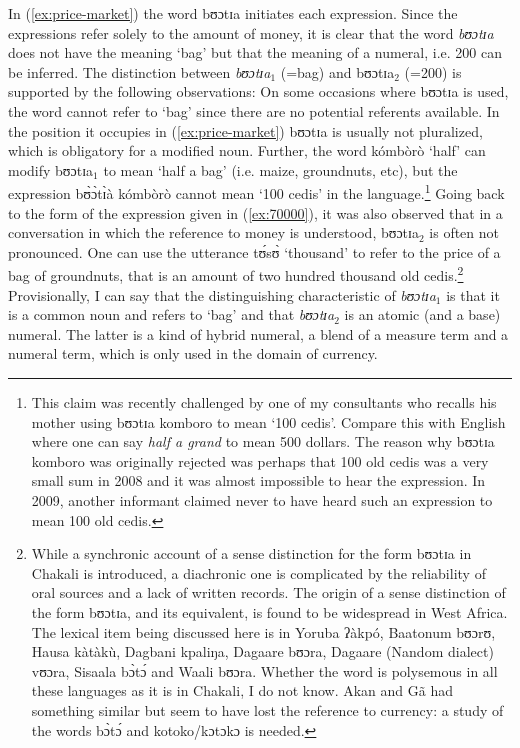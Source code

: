 \begin{exe}
\begin{exe}
\begin{exe}
{\begin{exe}
\begin{exe}
\begin{exe}
\begin{exe}
\begin{exe}
\begin{exe}
\begin{exe}
\begin{exe}
\begin{exe}
In (\ref{ex:price-market}) the word {\sls bʊɔtɪa} initiates  each expression.
Since the
expressions refer solely to the amount of money, it is clear that the word {\it
bʊɔtɪa} does not have the  meaning `bag' but that  the
meaning of a numeral, i.e. 200 can be inferred. The distinction between {\it
bʊɔtɪa}$_{1}$ (=bag)
and {\sls bʊɔtɪa}$_{2}$  (=200) is supported by the following observations:  On 
some
occasions where  {\sls bʊɔtɪa} is used,  the word cannot refer to `bag' since
there are no potential referents available. In the position it occupies in
(\ref{ex:price-market}) {\sls bʊɔtɪa} is usually not pluralized, which is
obligatory for a modified noun. Further, the word {\sls kómbòrò} `half' can 
modify
{\sls 
bʊɔtɪa}$_{1}$  to mean `half a bag' (i.e. maize, groundnuts, etc), but  the
expression {\sls bʊ̀ɔ̀tɪ̀à kómbòrò} cannot mean `100 cedis' in the
language.\footnote{This claim was recently challenged by one of my consultants
who recalls his  mother using  {\sls bʊɔtɪa komboro} to mean `100 cedis'.  
Compare
this with English  where one can say \textit{half a grand} to mean 500
dollars. The reason why {\sls bʊɔtɪa komboro} was originally rejected was 
perhaps
that 100 old cedis was a very small sum  in 2008 and it was almost impossible
to hear the expression. In 2009,  another informant claimed never to have
heard such an expression to mean 100 old cedis.}  Going back to the form of the
expression given in
(\ref{ex:70000}),
it was also observed that in a conversation in which the reference to money is
understood, {\sls bʊɔtɪa}$_{2}$  is often not pronounced. One can use the 
utterance {\sls tʊ́sʊ̀}  `thousand' to refer to the price of a bag of 
groundnuts, that is an
amount of
two hundred thousand old cedis.\footnote{While a synchronic account of a sense
distinction for the form {\sls bʊɔtɪa} in Chakali is introduced, a diachronic 
one
is complicated by the reliability of oral sources and a lack of written records.
The origin of a sense distinction of the form {\sls bʊɔtɪa},  and its 
equivalent,   is found to be widespread in West Africa.  The lexical
item being discussed here is in Yoruba {\sls ʔàkpó}, Baatonum {\sls bʊɔrʊ}, 
Hausa
{\sls kàtàkù},  Dagbani {\sls kpaliŋa}, Dagaare {\sls bʊɔra}, Dagaare 
(Nandom 
dialect)
{\sls vʊɔra}, Sisaala {\sls bɔ̀tɔ́} and Waali {\sls bʊɔra}. Whether the word is
polysemous
in all these languages as it is in Chakali, I do not know. Akan and Gã had
something similar but seem to have lost the reference to currency: a study of
the words {\sls  bɔ̀tɔ́} and {\sls kotoko}/{\sls kɔtɔkɔ}  is needed.} 
Provisionally, I can say that the distinguishing characteristic of {\it
bʊɔtɪa}$_{1}$ is that it is a common noun and refers to `bag' and that {\it
bʊɔtɪa}$_{2}$ is an atomic (and a base) numeral. The latter is  a kind of hybrid
 numeral, a blend of a measure term and a numeral term,   which is only used in
the domain of currency.



\end{exe}
\end{exe}
\end{exe}
\end{exe}
\end{exe}
\end{exe}
\end{exe}
\end{exe}
\end{exe}}
\end{exe}
\end{exe}
\end{exe}
